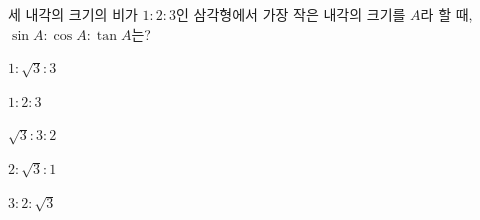 세 내각의 크기의 비가 $1:2:3$인 삼각형에서 가장 작은 내각의 크기를 $A$라 할 때, $\sin A:\cos A:\tan A$는?
\begin{choices32}{\rule[-3ex]{0pt}{8ex}$1:\sqrt{3}:3$}{\rule[-3ex]{0pt}{8ex}$1:2:3$}{\rule[-3ex]{0pt}{8ex}$\sqrt{3}:3:2$}{\rule[-3ex]{0pt}{8ex}$2:\sqrt{3}:1$}{\rule[-3ex]{0pt}{8ex}$3:2:\sqrt{3}$}\end{choices32}
